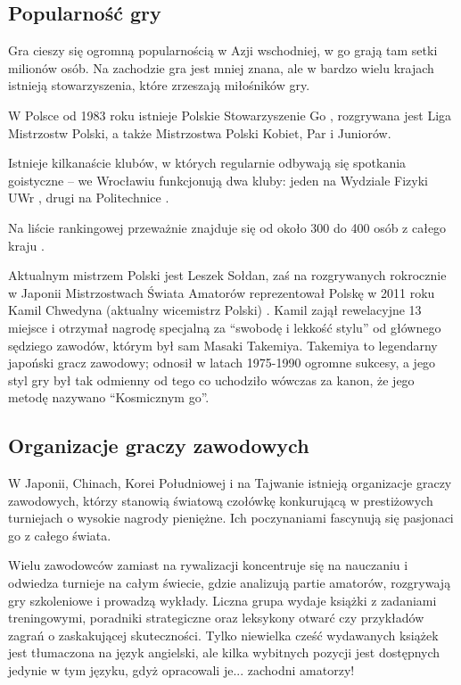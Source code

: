\documentclass[11pt,leqno]{article}
\begin{document}
\subsection{Popularność gry }

Gra cieszy się ogromną popularnością w Azji wschodniej, w go grają tam setki milionów osób. Na zachodzie gra jest mniej znana, 
ale w bardzo wielu krajach istnieją stowarzyszenia, które zrzeszają miłośników gry. 

W Polsce od 1983 roku istnieje Polskie Stowarzyszenie Go \cite{psg}, 
rozgrywana jest Liga Mistrzostw Polski, a także Mistrzostwa Polski Kobiet, Par i Juniorów. 

Istnieje kilkanaście klubów, w których regularnie odbywają się spotkania goistyczne 
-- we Wrocławiu funkcjonują dwa kluby: jeden na Wydziale Fizyki UWr \cite{gokurabu}, drugi na Politechnice \cite{sente}.

 Na liście rankingowej przeważnie znajduje się od około 300 do 400 osób z całego kraju \cite{ranking}.

Aktualnym mistrzem Polski jest Leszek Sołdan, zaś na rozgrywanych rokrocznie w Japonii Mistrzostwach Świata Amatorów 
reprezentował Polskę w 2011 roku Kamil Chwedyna (aktualny wicemistrz Polski) \cite{kamil1}. 
Kamil zajął rewelacyjne 13 miejsce \cite{kamil2} i otrzymał nagrodę specjalną za 
``swobodę i lekkość stylu'' od głównego sędziego zawodów, którym był sam Masaki Takemiya. 
Takemiya to legendarny japoński gracz zawodowy; odnosił w latach 1975-1990 ogromne sukcesy, a jego styl
gry był tak odmienny od tego co uchodziło wówczas za kanon, że jego metodę nazywano ``Kosmicznym go''.

\subsection{Organizacje graczy zawodowych}
W Japonii, Chinach, Korei Południowej i na Tajwanie istnieją organizacje graczy zawodowych, którzy stanowią światową czołówkę konkurującą w 
prestiżowych turniejach o wysokie nagrody pieniężne. Ich poczynaniami fascynują się pasjonaci go z całego świata. 

Wielu zawodowców zamiast na rywalizacji koncentruje się na nauczaniu i odwiedza turnieje na całym świecie, gdzie analizują 
partie amatorów, rozgrywają gry szkoleniowe i prowadzą wykłady. Liczna grupa wydaje książki z zadaniami treningowymi, 
poradniki strategiczne oraz leksykony otwarć czy przykładów zagrań o zaskakującej skuteczności. 
Tylko niewielka cześć wydawanych książek jest tłumaczona na język angielski, ale kilka wybitnych
 pozycji jest dostępnych jedynie w tym języku, gdyż opracowali je... zachodni amatorzy!
\end{document}
